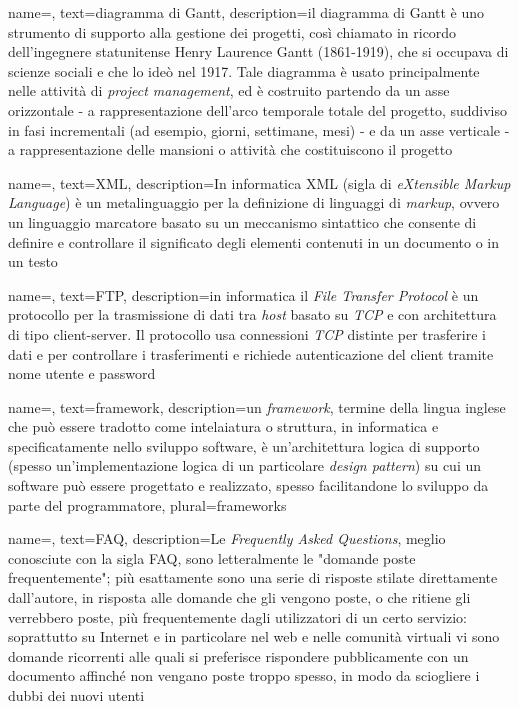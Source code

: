 {
    name=,
    text=diagramma di Gantt,
    description={il diagramma di Gantt è uno strumento di supporto alla
gestione dei progetti, così chiamato in ricordo dell'ingegnere statunitense Henry
Laurence Gantt (1861-1919), che si occupava di scienze sociali e che lo ideò
nel 1917. Tale diagramma è usato principalmente nelle attività di \emph{project
management}, ed è costruito partendo da un asse orizzontale - a rappresentazione
dell’arco temporale totale del progetto, suddiviso in fasi incrementali (ad esempio,
giorni, settimane, mesi) - e da un asse verticale - a rappresentazione delle mansioni
o attività che costituiscono il progetto}
}

{
    name=,
    text=XML,
    description={In informatica XML (sigla di \emph{eXtensible Markup Language}) è un metalinguaggio per la definizione di linguaggi di \emph{markup}, ovvero un linguaggio marcatore basato su un meccanismo sintattico che consente di definire e controllare il significato degli elementi contenuti in un documento o in un testo}
}

{
    name=,
    text=FTP,
    description={in informatica il \emph{File Transfer Protocol} è un protocollo per la trasmissione di dati tra \emph{host} basato su \emph{TCP} e con architettura di tipo client-server. Il protocollo usa connessioni \emph{TCP} distinte per trasferire i dati e per controllare i trasferimenti e richiede autenticazione del client tramite nome utente e password}
}

{
    name=,
    text=framework,
    description={un \emph{framework}, termine della lingua inglese che può essere tradotto come intelaiatura o struttura, in informatica e specificatamente nello sviluppo software, è un'architettura logica di supporto (spesso un'implementazione logica di un particolare \emph{design pattern}) su cui un software può essere progettato e realizzato, spesso facilitandone lo sviluppo da parte del programmatore},
    plural=frameworks
}

{
    name=,
    text=FAQ,
    description={Le \emph{Frequently Asked Questions}, meglio conosciute con la sigla FAQ, sono letteralmente le "domande poste frequentemente"; più esattamente sono una serie di risposte stilate direttamente dall'autore, in risposta alle domande che gli vengono poste, o che ritiene gli verrebbero poste, più frequentemente dagli utilizzatori di un certo servizio: soprattutto su Internet e in particolare nel web e nelle comunità virtuali vi sono domande ricorrenti alle quali si preferisce rispondere pubblicamente con un documento affinché non vengano poste troppo spesso, in modo da sciogliere i dubbi dei nuovi utenti}
}

